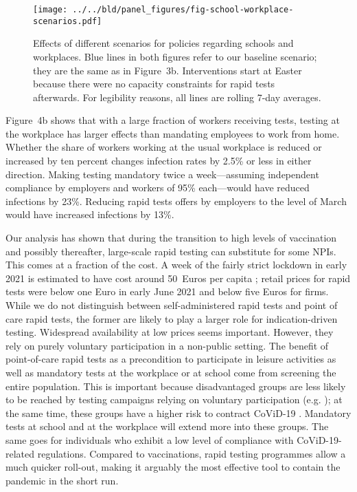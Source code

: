 \documentclass[fleqn,10pt]{wlscirep}
\begin{document}
\begin{figure}[tb]
    \centering
    \texttt{[image: ../../bld/panel\_figures/fig-school-workplace-scenarios.pdf]}
    \caption{
        Effects of different scenarios for policies regarding schools and workplaces.
        Blue lines in both figures refer to our baseline scenario; they are the same as
        in Figure~3b. Interventions start at Easter because there were no capacity
        constraints for rapid tests afterwards. For legibility reasons, all lines are
        rolling 7-day averages.
    }
    \label{fig:school_workplace_scenarios}
\end{figure}

Figure~4b shows that with a large fraction of workers
receiving tests, testing at the workplace has larger effects than mandating employees to
work from home. Whether the share of workers working at the usual workplace is reduced
or increased by ten percent changes infection rates by 2.5\% or less in either
direction. Making testing mandatory twice a week---assuming independent compliance by
employers and workers of 95\% each---would have reduced infections by 23\%. Reducing
rapid tests offers by employers to the level of March would have increased infections by
13\%.

Our analysis has shown that during the transition to high levels of vaccination and
possibly thereafter, large-scale rapid testing can substitute for some NPIs. This comes
at a fraction of the cost. A week of the fairly strict lockdown in early 2021 is
estimated to have cost around 50~Euros per capita \cite{Wollmershauser2021}; retail
prices for rapid tests were below one Euro in early June 2021 and below five Euros for
firms. While we do not distinguish between self-administered rapid tests and point of
care rapid tests, the former are likely to play a larger role for indication-driven
testing. Widespread availability at low prices seems important. However, they rely on
purely voluntary participation in a non-public setting. The benefit of point-of-care
rapid tests as a precondition to participate in leisure activities as well as mandatory
tests at the workplace or at school come from screening the entire population. This is
important because disadvantaged groups are less likely to be reached by testing
campaigns relying on voluntary participation (e.g. \cite{StillmanTonin2021}); at the
same time, these groups have a higher risk to contract CoViD-19
\cite{KochInstitut2021a}. Mandatory tests at school and at the workplace will extend
more into these groups. The same goes for individuals who exhibit a low level of
compliance with CoViD-19-related regulations. Compared to vaccinations, rapid testing
programmes allow a much quicker roll-out, making it arguably the most effective tool to
contain the pandemic in the short run.
\end{document}
